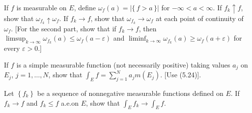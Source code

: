 \begin{problem}
  If $f$ is measurable on $E$, define $\omega_f(a)=|\{\,f>a\,\}|$ for
  $-\infty<a<\infty$. If $f_k\uparrow f$, show that
  $\omega_{f_k}\uparrow\omega_f$. If $f_k\to f$, show that
  $\omega_{f_k}\to\omega_f$ at each point of continuity of $\omega_f$. [For
  the second part, show that if $f_k\to f$, then
  $\limsup_{k\to\infty}\omega_{f_k}(a)\leq\omega_f(a-\varepsilon)$ and
  $\liminf_{k\to\infty}\omega_{f_k}(a)\geq\omega_f(a+\varepsilon)$ for
  every $\varepsilon>0$.]
\end{problem}
\begin{solution}

\end{solution}

\begin{problem}
  If $f$ is a simple measurable function (not necessarily positive) taking
  values $a_j$ on $E_j$, $j=1,\ldots,N$, show that
  $\int_E f=\sum_{j=1}^N a_jm(E_j)$. [Use (5.24)].
\end{problem}
\begin{solution}
\end{solution}

\begin{problem}
  Let $\left\{f_k\right\}$ be a sequence of nonnegative measurable
  functions defined on $E$. If $f_k\to f$ and $f_k\leq f$ a.e.\@ on $E$,
  show that $\int_E f_k\to\int_E f$.
\end{problem}
\begin{solution}
\end{solution}


